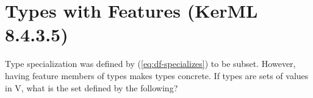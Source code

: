 %		
%


\section{Types with Features (KerML 8.4.3.5)}

\pn Type specialization was defined by (\ref{eq:df-specializes}) to be subset.  However, having feature members of types makes types concrete.  
If types are sets of values in $\mathrm{V}$, what is the set defined by the following?

